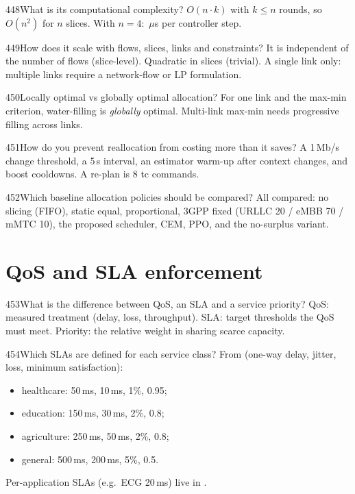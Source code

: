 \begin{qa}{448}{What is its computational complexity?}
$O(n\cdot k)$ with $k\le n$ rounds, so $O(n^2)$ for $n$ slices. With $n=4$: \NCtrlStepUs\,$\mu$s per controller step.
\end{qa}

\begin{qa}{449}{How does it scale with flows, slices, links and constraints?}
It is independent of the number of flows (slice-level). Quadratic in slices (trivial). A single link only: multiple
links require a network-flow or LP formulation.
\end{qa}

\begin{qa}{450}{Locally optimal vs globally optimal allocation?}
For one link and the max-min criterion, water-filling is \emph{globally} optimal. Multi-link max-min needs progressive
filling across links.
\end{qa}

\begin{qa}{451}{How do you prevent reallocation from costing more than it saves?}
A 1\,Mb/s change threshold, a 5\,s interval, an estimator warm-up after context changes, and boost cooldowns. A re-plan
is 8 tc commands.
\end{qa}

\begin{qa}{452}{Which baseline allocation policies should be compared?}
All compared: no slicing (FIFO), static equal, proportional, 3GPP fixed (URLLC 20 / eMBB 70 / mMTC 10), the proposed
scheduler, CEM, PPO, and the no-surplus variant.
\end{qa}

\FigMainSla

\section{QoS and SLA enforcement}

\begin{qa}{453}{What is the difference between QoS, an SLA and a service priority?}
QoS: measured treatment (delay, loss, throughput). SLA: target thresholds the QoS must meet. Priority: the relative
weight in sharing scarce capacity.
\end{qa}

\begin{qa}{454}{Which SLAs are defined for each service class?}
From  (one-way delay, jitter, loss, minimum satisfaction):
\begin{itemize}
\item healthcare: 50\,ms, 10\,ms, 1\%, 0.95;
\item education: 150\,ms, 30\,ms, 2\%, 0.8;
\item agriculture: 250\,ms, 50\,ms, 2\%, 0.8;
\item general: 500\,ms, 200\,ms, 5\%, 0.5.
\end{itemize}
Per-application SLAs (e.g.\ ECG 20\,ms) live in .
\end{qa}

